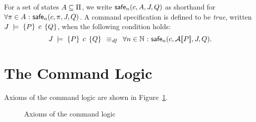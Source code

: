 \documentclass[11pt]{report}
\begin{document}
For a set of states $A \subseteq \Pi$, we write $\mathsf{safe}_{n}(c,A,J,Q)$ as shorthand for $\forall \pi \in A \operatorname{\,:\,} \mathsf{safe}_{n}(c,\pi,J,Q)$. A command specification is defined to be \emph{true}, written $J\;\models\;\left\lbrace P \right\rbrace\;c\;\left\lbrace Q \right\rbrace$, when the following condition holds: \[ J\;\models\;\left\lbrace P \right\rbrace\;c\;\left\lbrace Q \right\rbrace \;\operatorname{\;\equiv_{\mathit{df}}\;}\; \forall n\in \mathbb{N} \operatorname{\,:\,} \mathsf{safe}_{n}(c,\mathcal{A}[\![P]\!],J,Q).\]




\section{The Command Logic} %
\label{sec:the_command_logic}

Axioms of the command logic are shown in Figure~\ref{fig:command-logic-axioms}.
\begin{figure}[h]
	\centering
	
		
		\vspace{1em}
	
		
		\vspace{1em}
	
		
		\vspace{1em}
	
		
		\vspace{1em}
	
		
		\vspace{1em}
	
		
		\vspace{1em}
	
		
		
	\caption{Axioms of the command logic}
	\label{fig:command-logic-axioms}
\end{figure}
\end{document}
